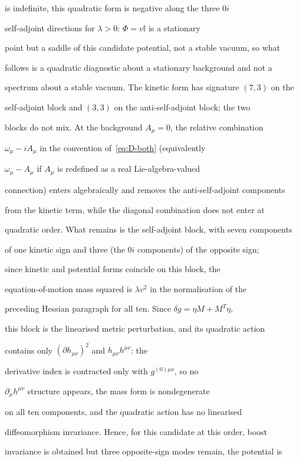 is indefinite, this quadratic form is negative along the three \(0i\)

self-adjoint directions for \(\lambda>0\): \(\Phi=v\mathbb{I}\) is a stationary

point but a saddle of this candidate potential, not a stable vacuum, so what

follows is a quadratic diagnostic about a stationary background and not a

spectrum about a stable vacuum. The kinetic form has signature \((7,3)\) on the

self-adjoint block and \((3,3)\) on the anti-self-adjoint block; the two

blocks do not mix. At the background \(A_\mu=0\), the relative combination

\(\omega_\mu-iA_\mu\) in the convention of~\eqref{eq:D-both} (equivalently

\(\omega_\mu-A_\mu\) if \(A_\mu\) is redefined as a real Lie-algebra-valued

connection) enters algebraically and removes the anti-self-adjoint components

from the kinetic term, while the diagonal combination does not enter at

quadratic order. What remains is the self-adjoint block, with seven components

of one kinetic sign and three (the \(0i\) components) of the opposite sign;

since kinetic and potential forms coincide on this block, the

equation-of-motion mass squared is \(\lambda v^2\) in the normalisation of the

preceding Hessian paragraph for all ten. Since \(\delta g=\eta M+M^{T}\eta\),

this block is the linearised metric perturbation, and its quadratic action

contains only \((\partial h_{\mu\nu})^2\) and \(h_{\mu\nu}h^{\mu\nu}\): the

derivative index is contracted only with \(g^{(0)\mu\nu}\), so no

\(\partial_\mu h^{\mu\nu}\) structure appears, the mass form is nondegenerate

on all ten components, and the quadratic action has no linearised

diffeomorphism invariance. Hence, for this candidate at this order, boost

invariance is obtained but three opposite-sign modes remain, the potential is


